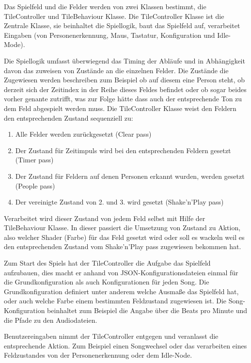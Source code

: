 \label{sec:tiles}

Das Spielfeld und die Felder werden von zwei Klassen bestimmt, die TileController und TileBehaviour Klasse. 
Die TileController Klasse ist die Zentrale Klasse, sie beinhaltet die Spiellogik, baut das Spielfeld auf, verarbeitet Eingaben (von Personenerkennung, Maus, Tastatur, Konfiguration und Idle-Mode).

Die Spiellogik umfasst überwiegend das Timing der Abläufe und in Abhängigkeit davon das zuweisen von Zustände an die einzelnen Felder. Die Zustände die Zugewiesen werden beschreiben zum Beispiel ob auf diesem eine Person steht, ob derzeit sich der Zeitindex in der Reihe dieses Feldes befindet oder ob sogar beides vorher genante zutrifft, was zur Folge hätte dass auch der entsprechende Ton zu dem Feld abgespielt werden muss. Die TileController Klasse weist den Feldern den entsprechenden Zustand sequenziell zu:
\begin{enumerate}
\item Alle Felder werden zurückgesetzt (Clear pass)
\item Der Zustand für Zeitimpuls wird bei den entsprechenden Feldern gesetzt (Timer pass)
\item Der Zustand für Feldern auf denen Personen erkannt wurden, werden gesetzt (People pass)
\item Der vereinigte Zustand von 2. und 3. wird gesetzt (Shake'n'Play pass)
\end{enumerate}
Verarbeitet wird dieser Zustand von jedem Feld selbst mit Hilfe der TileBehaviour Klasse. In dieser passiert die Umsetzung von Zustand zu Aktion, also welcher Shader (Farbe) für das Feld gesetzt wird oder soll es wackeln weil es den entsprechenden Zustand vom Shake'n'Play pass zugewiesen bekommen hat.

Zum Start des Spiels hat der TileController die Aufgabe das Spielfeld aufzubauen, dies macht er anhand von JSON-Konfigurationsdateien einmal für die Grundkonfiguration als auch Konfigurationen für jeden Song. Die Grundkonfiguration definiert unter anderem welche Ausmaße das Spielfeld hat, oder auch welche Farbe einem bestimmten Feldzustand zugewiesen ist. Die Song-Konfiguration beinhaltet zum Beispiel die Angabe über die Beats pro Minute und die Pfade zu den Audiodateien.

Benutzereingaben nimmt der TileController entgegen und veranlasst die entsprechende Aktion. Zum Beispiel einen Songwechsel oder das verarbeiten eines Feldzustandes von der Personenerkennung oder dem Idle-Node.


